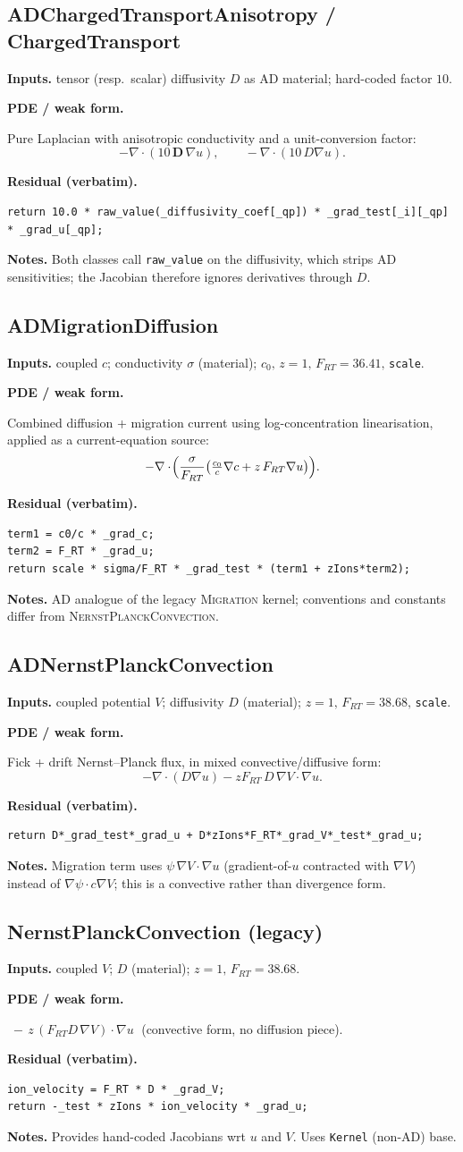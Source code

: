 \documentclass[11pt]{article}
\newenvironment{ecmEntry}[1]{%
  \subsection{#1}%
}{}
\newcommand{\inputsRow}[1]{\par\noindent\textbf{Inputs.} #1\par}
\newcommand{\pdeRow}[1]{\par\noindent\textbf{PDE / weak form.}\par #1\par}
\newcommand{\codeRow}{\par\noindent\textbf{Residual (verbatim).}\par}
\newcommand{\notesRow}[1]{\par\noindent\textbf{Notes.} #1\par}
\begin{document}
\begin{ecmEntry}{ADChargedTransportAnisotropy / ChargedTransport}
\inputsRow{tensor (resp.\ scalar) diffusivity $D$ as AD material; hard-coded factor $10$.}
\pdeRow{Pure Laplacian with anisotropic conductivity and a unit-conversion factor:
\[
  -\nabla\cdot(10\,\bm{D}\,\nabla u),\qquad
  -\nabla\cdot(10\,D\nabla u).
\]}
\codeRow\begin{lstlisting}
return 10.0 * raw_value(_diffusivity_coef[_qp]) * _grad_test[_i][_qp] * _grad_u[_qp];
\end{lstlisting}
\notesRow{Both classes call \texttt{raw\_value} on the diffusivity, which strips AD
sensitivities; the Jacobian therefore ignores derivatives through $D$.}
\end{ecmEntry}

\begin{ecmEntry}{ADMigrationDiffusion}
\inputsRow{coupled $c$; conductivity $\sigma$ (material); $c_0,\,z=1,\,F_{RT}=36.41,\,$\texttt{scale}.}
\pdeRow{Combined diffusion + migration current using log-concentration linearisation,
applied as a current-equation source:
\[
  -\nabla\cdot\!\Bigl(\frac{\sigma}{F_{RT}}\bigl(\tfrac{c_0}{c}\nabla c + z\,F_{RT}\nabla u\bigr)\Bigr).
\]}
\codeRow\begin{lstlisting}
term1 = c0/c * _grad_c;
term2 = F_RT * _grad_u;
return scale * sigma/F_RT * _grad_test * (term1 + zIons*term2);
\end{lstlisting}
\notesRow{AD analogue of the legacy \textsc{Migration} kernel; conventions and constants
differ from \textsc{NernstPlanckConvection}.}
\end{ecmEntry}

\begin{ecmEntry}{ADNernstPlanckConvection}
\inputsRow{coupled potential $V$; diffusivity $D$ (material); $z=1,\,F_{RT}=38.68,\,$\texttt{scale}.}
\pdeRow{Fick + drift Nernst--Planck flux, in mixed convective/diffusive form:
\[
  -\nabla\cdot(D\nabla u) - z F_{RT}\,D\,\nabla V\!\cdot\!\nabla u.
\]}
\codeRow\begin{lstlisting}
return D*_grad_test*_grad_u + D*zIons*F_RT*_grad_V*_test*_grad_u;
\end{lstlisting}
\notesRow{Migration term uses $\psi\,\nabla V\!\cdot\!\nabla u$ (gradient-of-$u$ contracted
with $\nabla V$) instead of $\nabla\psi\cdot c\nabla V$; this is a convective rather
than divergence form.}
\end{ecmEntry}

\begin{ecmEntry}{NernstPlanckConvection (legacy)}
\inputsRow{coupled $V$; $D$ (material); $z=1,\,F_{RT}=38.68$.}
\pdeRow{$\;-\,z\,(F_{RT} D\,\nabla V)\cdot\nabla u\;$ (convective form, no diffusion piece).}
\codeRow\begin{lstlisting}
ion_velocity = F_RT * D * _grad_V;
return -_test * zIons * ion_velocity * _grad_u;
\end{lstlisting}
\notesRow{Provides hand-coded Jacobians wrt $u$ and $V$. Uses
\texttt{Kernel} (non-AD) base.}
\end{ecmEntry}
\end{document}
